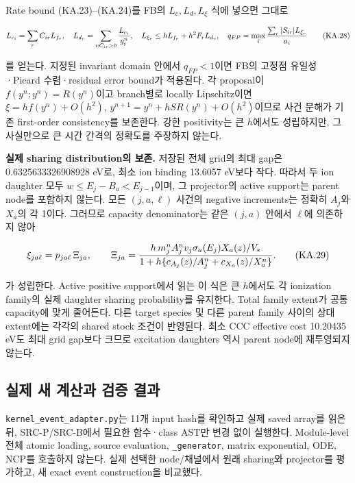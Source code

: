 \documentclass[11pt,a4paper]{article}
\begin{document}
Rate bound (KA.23)--(KA.24)를 FB의 \(L_c,L_d,L_\xi\) 식에 넣으면 그대로

\[
 L_{c_i}=\sum_r C_{ir}L_{f_r},\quad
 L_{d_r}=\sum_{i:C_{ir}>0}{L_{c_i}\over y_i^n},\quad
 L_{\xi_r}\le hL_{f_r}+h^2 F_rL_{d_r},\quad
 q_{FP}=\max_i{\sum_r|S_{ir}|L_{\xi_r}\over a_i}
 \tag{KA.28}
\]

를 얻는다. 지정된 invariant domain 안에서 \(q_{FP}<1\)이면 FB의 고정점 유일성·Picard 수렴·residual error bound가 적용된다. 각 proposal이 \(f(y^n;y^n)=R(y^n)\)이고 branch별로 locally Lipschitz이면 \(\xi=hf(y^n)+O(h^2)\), \(y^{n+1}=y^n+hSR(y^n)+O(h^2)\)이므로 사건 분해가 기존 first-order consistency를 보존한다. 강한 positivity는 큰 \(h\)에서도 성립하지만, 그 사실만으로 큰 시간 간격의 정확도를 주장하지 않는다.

\textbf{실제 sharing distribution의 보존.} 저장된 전체 grid의 최대 gap은 0.6325633326908928 eV로, 최소 ion binding 13.6057 eV보다 작다. 따라서 두 ion daughter 모두 \(w\le E_j-B_a<E_{j-1}\)이며, 그 projector의 active support는 parent node를 포함하지 않는다. 모든 \((j,a,\ell)\) 사건의 negative increments는 정확히 \(A_j\)와 \(X_a\)의 각 1이다. 그러므로 capacity denominator는 같은 \((j,a)\) 안에서 \(\ell\)에 의존하지 않아

\[
 \xi_{ja\ell}=p_{ja\ell}\,\Xi_{ja},\qquad
 \Xi_{ja}={h\,m_j^n A_j^n v_j\sigma_a(E_j)X_a(z)/V_*
  \over1+h\{c_{A_j}(z)/A_j^n+c_{X_a}(z)/X_a^n\}}.
 \tag{KA.29}
\]

가 성립한다. Active positive support에서 읽는 이 식은 큰 \(h\)에서도 각 ionization family의 실제 daughter sharing probability를 유지한다. Total family extent가 공통 capacity에 맞게 줄어든다. 다른 target species 및 다른 parent family 사이의 상대 extent에는 각각의 shared stock 조건이 반영된다. 최소 CCC effective cost 10.20435 eV도 최대 grid gap보다 크므로 excitation daughters 역시 parent node에 재투영되지 않는다.

\hypertarget{uxc2e4uxc81c-uxc0c8-uxacc4uxc0b0uxacfc-uxac80uxc99d-uxacb0uxacfc}{%
\subsection{실제 새 계산과 검증 결과}\label{uxc2e4uxc81c-uxc0c8-uxacc4uxc0b0uxacfc-uxac80uxc99d-uxacb0uxacfc}}

\texttt{kernel\_event\_adapter.py}는 11개 input hash를 확인하고 실제 saved array를 읽은 뒤, SRC-P/SRC-B에서 필요한 함수·class AST만 변경 없이 실행한다. Module-level 전체 atomic loading, source evaluation, \texttt{\_generator}, matrix exponential, ODE, NCP를 호출하지 않는다. 실제 선택한 node/채널에서 원래 sharing와 projector를 평가하고, 새 exact event construction을 비교했다.
\end{document}

